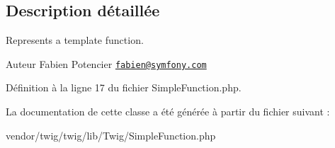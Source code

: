 \subsection{Description détaillée}
Represents a template function.

\begin{DoxyAuthor}{Auteur}
Fabien Potencier \href{mailto:fabien@symfony.com}{\tt fabien@symfony.\+com} 
\end{DoxyAuthor}


Définition à la ligne 17 du fichier Simple\+Function.\+php.



La documentation de cette classe a été générée à partir du fichier suivant \+:\begin{DoxyCompactItemize}
\item 
vendor/twig/twig/lib/\+Twig/Simple\+Function.\+php\end{DoxyCompactItemize}

